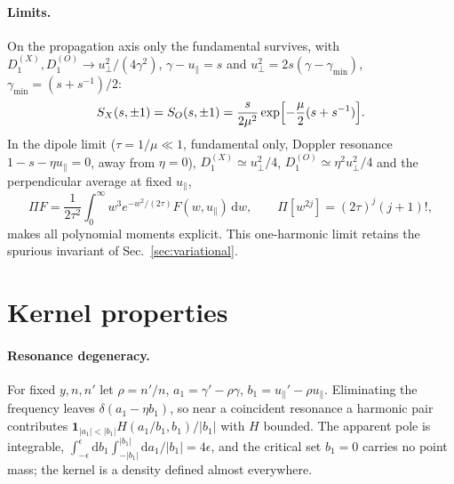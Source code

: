 \documentclass[11pt,a4paper]{article}
\numberwithin{equation}{section}
\newcommand{\dd}{\mathrm{d}}
\newcommand{\upar}{u_\parallel}
\newcommand{\uperp}{u_\perp}
\begin{document}
\paragraph{Limits.} On the propagation axis only the fundamental survives, with
$D_1^{(X)},D_1^{(O)}\to\uperp^2/(4\gamma^2)$, $\gamma-\upar=s$ and
$\uperp^2=2s(\gamma-\gamma_{\min})$, $\gamma_{\min}=(s+s^{-1})/2$:
\begin{equation}
S_X(s,\pm1)=S_O(s,\pm1)=\frac{s}{2\mu^2}\exp\Bigl[-\frac\mu2(s+s^{-1})\Bigr].
\label{eq:axis}
\end{equation}
In the dipole limit ($\tau=1/\mu\ll1$, fundamental only, Doppler resonance
$1-s-\eta\upar=0$, away from $\eta=0$), $D_1^{(X)}\simeq\uperp^2/4$,
$D_1^{(O)}\simeq\eta^2\uperp^2/4$ and the perpendicular average at fixed $\upar$,
\begin{equation}
\Pi F=\frac1{2\tau^2}\int_0^\infty w^3e^{-w^2/(2\tau)}F(w,\upar)\,\dd w,\qquad \Pi[w^{2j}]=(2\tau)^j(j+1)!,
\end{equation}
makes all polynomial moments explicit. This one-harmonic limit retains the
spurious invariant of Sec.~\ref{sec:variational}.

\section{Kernel properties}\label{sec:properties}

\paragraph{Resonance degeneracy.} For fixed $y,n,n'$ let $\rho=n'/n$,
$a_1=\gamma'-\rho\gamma$, $b_1=\upar'-\rho\upar$. Eliminating the frequency
leaves $\delta(a_1-\eta b_1)$, so near a coincident resonance a harmonic pair
contributes $\mathbf 1_{|a_1|<|b_1|}H(a_1/b_1,b_1)/|b_1|$ with $H$ bounded.
The apparent pole is integrable,
$\int_{-\epsilon}^{\epsilon}\dd b_1\int_{-|b_1|}^{|b_1|}\dd a_1/|b_1|=4\epsilon$,
and the critical set $b_1=0$ carries no point mass; the kernel is a density
defined almost everywhere.
\end{document}
